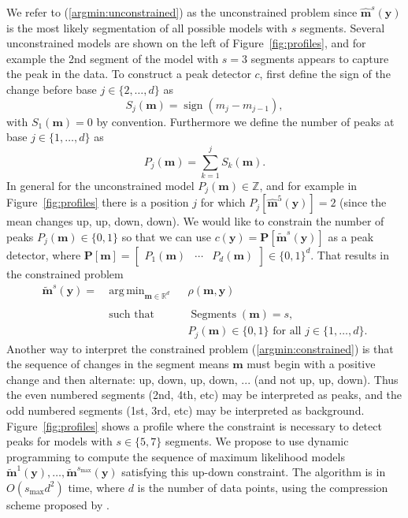 \documentclass{article}
\DeclareMathOperator*{\argmin}{arg\,min}
\DeclareMathOperator*{\sign}{sign}
\DeclareMathOperator*{\Lik}{Lik}
\DeclareMathOperator*{\Segments}{Segments}
\newcommand{\ZZ}{\mathbb Z}
\newcommand{\RR}{\mathbb R}
\begin{document}
We refer to (\ref{argmin:unconstrained}) as the unconstrained problem
since $\mathbf{\hat m}^s(\mathbf y)$ is the most likely segmentation
of all possible models with $s$ segments. Several unconstrained models
are shown on the left of Figure~\ref{fig:profiles}, and for example
the 2nd segment of the model with $s=3$ segments appears to capture
the peak in the data. 
To construct a peak detector $c$, first define the sign of the change
before base $j\in\{2, \dots, d\}$ as
\begin{equation}
  \label{eq:sign}
  S_j(\mathbf m) = \sign( m_{j} - m_{j-1} ),
\end{equation}
with $S_1(\mathbf m)=0$ by convention. Furthermore we define the number
of peaks at base $j\in\{1, \dots, d\}$ as
\begin{equation}
  \label{eq:peaks}
  P_j(\mathbf m) = \sum_{k=1}^j S_k(\mathbf m).
\end{equation}
In general for the unconstrained model $P_j(\mathbf m)\in\ZZ$, and for
example in Figure~\ref{fig:profiles} there is a position $j$ for which
$P_j\left[ \mathbf{\hat m}^5(\mathbf y) \right]=2$ (since the mean
changes up, up, down, down). We would like to constrain the number of
peaks $P_j(\mathbf m)\in\{0, 1\}$ so that we can use $c(\mathbf y) =
\mathbf P\left[ \mathbf{\tilde m}^s(\mathbf y) \right]$ as a peak
detector, where $\mathbf P[\mathbf m] = \left[\begin{array}{ccc}
    P_1(\mathbf m) & \cdots & P_d(\mathbf m)
\end{array}\right]\in\{0, 1\}^d$. That results 
in the constrained problem
\begin{equation}
  \label{argmin:constrained}
  \begin{aligned}
    \mathbf{\tilde m}^s(\mathbf y)  =\ 
    &\argmin_{\mathbf m\in\RR^{d}} && 
    \rho
    (\mathbf m, \mathbf y) \\
    \\
    &\text{such that} && \Segments(\mathbf m)=s,\\
    &&& P_j(\mathbf m) \in\{0, 1\} \text{ for all } j\in\{1, \dots, d\}.
  \end{aligned}
\end{equation}
Another way to interpret the constrained problem
(\ref{argmin:constrained}) is that the sequence of changes in the
segment means $\mathbf m$ must begin with a positive change and then
alternate: up, down, up, down, ... (and not up, up, down). Thus the
even numbered segments (2nd, 4th, etc) may be interpreted as peaks,
and the odd numbered segments (1st, 3rd, etc) may be interpreted as
background. Figure~\ref{fig:profiles} shows a profile where the
constraint is necessary to detect peaks for models with $s\in\{5, 7\}$
segments. We propose to use dynamic programming to compute the
sequence of maximum likelihood models $\mathbf{\tilde m}^1(\mathbf y),
\dots, \mathbf{\tilde m}^{s_{\text{max}}}(\mathbf y)$ satisfying this
up-down constraint.  The algorithm is in $O(s_{\text{max}} d^2)$ time,
where $d$ is the number of data points, using the compression scheme
proposed by \citet{Segmentor}.
\end{document}
